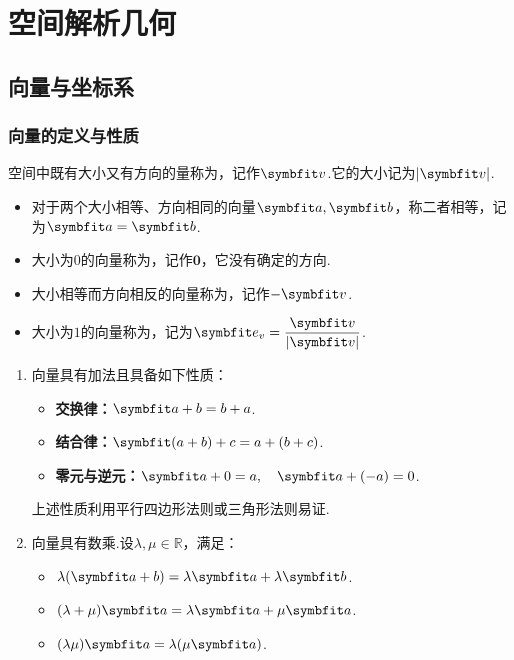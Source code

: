 \chapter{空间解析几何}
\section{向量与坐标系}
\subsection{向量的定义与性质}
\begin{definition}
    空间中既有大小又有方向的量称为，记作$\vb{v}$.它的大小记为$|\vb{v}|$.
    \begin{itemize}
        \item 对于两个大小相等、方向相同的向量$\vb{a},\vb{b}$，称二者相等，记为$\vb{a} = \vb{b}$.
        \item 大小为$0$的向量称为，记作$\bm{0}$，它没有确定的方向.
        \item 大小相等而方向相反的向量称为，记作$-\vb{v}$.
        \item 大小为$1$的向量称为，记为$\vb{e_v} = \dfrac{\vb{v}}{|\vb{v}|}$.
    \end{itemize}
\end{definition}

\begin{enumerate}[property]
    \item 向量具有加法且具备如下性质：
    \begin{itemize}
        \item \textbf{交换律：}$\vb{a + b = b + a}$.
        \item \textbf{结合律：}$\vb{(a + b) + c = a + (b + c)}$.
        \item \textbf{零元与逆元：}$\vb{a + 0 = a},\quad \vb{a + (-a) = 0}$.
    \end{itemize}
    上述性质利用平行四边形法则或三角形法则易证.
    \item 向量具有数乘.设$\lambda,\mu \in \mathbb{R}$，满足：
    \begin{itemize}
        \item $\lambda(\vb{a+b}) = \lambda\vb{a} + \lambda\vb{b}$.
        \item $(\lambda + \mu)\vb{a} = \lambda\vb{a} + \mu\vb{a}$.
        \item $(\lambda\mu)\vb{a} = \lambda(\mu\vb{a})$.
    \end{itemize}
\end{enumerate}

